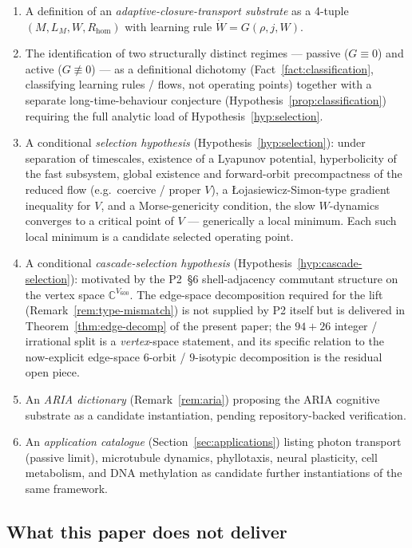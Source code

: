 \documentclass[11pt]{article}
\theoremstyle{definition}
\newcommand{\C}{\mathbb{C}}
\begin{document}
\begin{enumerate}
    \item A definition of an \emph{adaptive-closure-transport substrate} as a 4-tuple $(M, L_M, W, R_{\mathrm{hom}})$ with learning rule $\dot W = G(\rho, j, W)$.
    \item The identification of two structurally distinct regimes --- passive ($G \equiv 0$) and active ($G \not\equiv 0$) --- as a definitional dichotomy (Fact~\ref{fact:classification}, classifying learning rules / flows, not operating points) together with a separate long-time-behaviour conjecture (Hypothesis~\ref{prop:classification}) requiring the full analytic load of Hypothesis~\ref{hyp:selection}.
    \item A conditional \emph{selection hypothesis} (Hypothesis~\ref{hyp:selection}): under separation of timescales, existence of a Lyapunov potential, hyperbolicity of the fast subsystem, global existence and forward-orbit precompactness of the reduced flow (e.g.\ coercive / proper $V$), a {\L}ojasiewicz-Simon-type gradient inequality for $V$, and a Morse-genericity condition, the slow $W$-dynamics converges to a critical point of $V$ --- generically a local minimum. Each such local minimum is a candidate selected operating point.
    \item A conditional \emph{cascade-selection hypothesis} (Hypothesis~\ref{hyp:cascade-selection}): motivated by the P2~\S 6 shell-adjacency commutant structure on the vertex space $\C^{V_{600}}$. The edge-space decomposition required for the lift (Remark~\ref{rem:type-mismatch}) is not supplied by P2 itself but is delivered in Theorem~\ref{thm:edge-decomp} of the present paper; the $94 + 26$ integer / irrational split is a \emph{vertex}-space statement, and its specific relation to the now-explicit edge-space $6$-orbit / $9$-isotypic decomposition is the residual open piece.
    \item An \emph{ARIA dictionary} (Remark~\ref{rem:aria}) proposing the ARIA cognitive substrate as a candidate instantiation, pending repository-backed verification.
    \item An \emph{application catalogue} (Section~\ref{sec:applications}) listing photon transport (passive limit), microtubule dynamics, phyllotaxis, neural plasticity, cell metabolism, and DNA methylation as candidate further instantiations of the same framework.
\end{enumerate}

\subsection{What this paper does not deliver}
\end{document}
